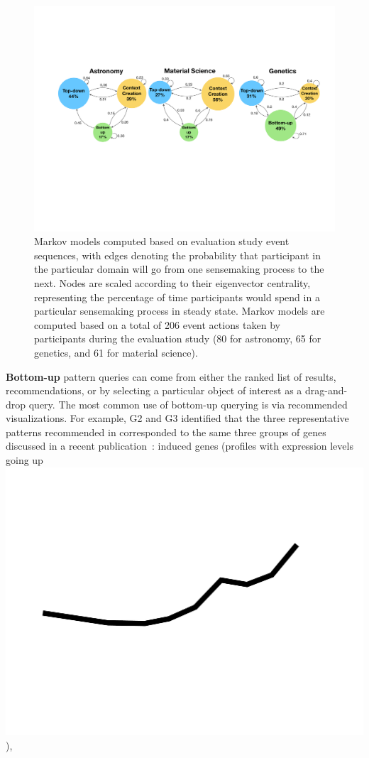   \begin{figure}[ht!]
   \centering
   \includegraphics[width=0.7\linewidth]{figures/markov_transition.pdf}
   \caption{Markov models computed based on evaluation study event sequences, with edges denoting the probability that participant in the particular domain will go from one sensemaking process to the next. Nodes are scaled according to their eigenvector centrality, representing the percentage of time participants would spend in a particular sensemaking process in steady state. Markov models are computed based on a total of 206 event actions taken by participants during the evaluation study (80 for astronomy, 65 for genetics, and 61 for material science).}\label{fig:transition}
   \vspace*{-15pt}
 \end{figure}
 \par \textbf{Bottom-up }pattern queries can come from either
 the ranked list of results,
 recommendations, or by selecting a
 particular object of interest as a drag-and-drop query. 
 The most common use of bottom-up querying
 is via recommended visualizations. For example, G2 and G3 identified that
 the three representative patterns
 recommended in \zvpp corresponded
 to the same three groups of genes discussed
 in a recent publication~\cite{Gloss2017}:
 induced genes (profiles with expression levels going up \includegraphics[width=2\baselineskip,keepaspectratio]{figures/up.pdf}),
